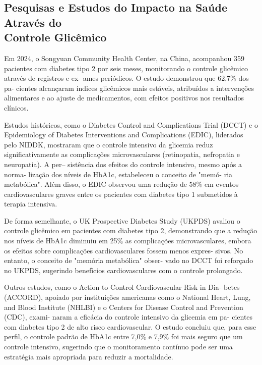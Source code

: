 \documentclass[conference]{IEEEtran}
\begin{document}
\subsection{Pesquisas e Estudos do Impacto na Saúde Através do \\Controle Glicêmico}
\sloppy
Em 2024, o Songyuan Community Health Center, na China, 
acompanhou 359 pacientes com diabetes tipo 2 por seis meses,
monitorando o controle glicêmico através de registros e ex-
ames periódicos. O estudo demonstrou que 62,7\% dos pa-
cientes alcançaram índices glicêmicos mais estáveis, atribuídos 
a intervenções alimentares e ao ajuste de medicamentos, com 
efeitos positivos nos resultados clínicos\cite{b10}. 
\par
Estudos históricos, como o Diabetes Control and Complications Trial (DCCT) e 
o Epidemiology of Diabetes Interventions and Complications 
(EDIC), liderados pelo NIDDK, mostraram que o controle 
intensivo da glicemia reduz significativamente as complicações 
microvasculares (retinopatia, nefropatia e neuropatia). A per--
sistência dos efeitos do controle intensivo, mesmo após a norma-
lização dos níveis de HbA1c, estabeleceu o conceito de "memó-
ria metabólica". Além disso, o EDIC observou uma redução 
de 58\% em eventos cardiovasculares graves entre os pacientes 
com diabetes tipo 1 submetidos à terapia intensiva\cite{b12}. 
\par
De forma semelhante, o UK Prospective Diabetes Study (UKPDS) 
avaliou o controle glicêmico em pacientes com diabetes tipo 
2, demonstrando que a redução nos níveis de HbA1c diminuiu 
em 25\% as complicações microvasculares, embora os efeitos 
sobre complicações cardiovasculares fossem menos expres-
sivos. No entanto, o conceito de "memória metabólica" obser-
vado no DCCT foi reforçado no UKPDS, sugerindo benefícios 
cardiovasculares com o controle prolongado\cite{b14}. 
\par
Outros estudos, como o Action to Control Cardiovascular Risk in Dia-
betes (ACCORD), apoiado por instituições americanas como 
o National Heart, Lung, and Blood Institute (NHLBI) e o 
Centers for Disease Control and Prevention (CDC), exami-
naram a eficácia do controle intensivo da glicemia em pa-
cientes com diabetes tipo 2 de alto risco cardiovascular. O 
estudo concluiu que, para esse perfil, o controle padrão de 
HbA1c entre 7,0\% e 7,9\% foi mais seguro que um controle 
intensivo, sugerindo que o monitoramento contínuo pode ser 
uma estratégia mais apropriada para reduzir a mortalidade\cite{b18}. 
\par
\end{document}
